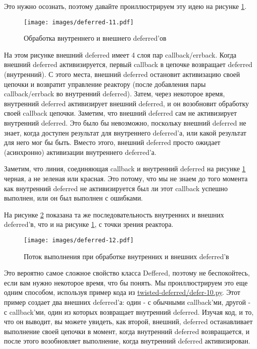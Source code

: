 Это нужно осознать, поэтому давайте проиллюстрируем эту идею 
на рисунке \ref{fig:deferred-11}.

\begin{figure}[h]
\begin{center}
    \texttt{[image: images/deferred-11.pdf]}
    \caption{Обработка внутреннего и внешнего deferred'ов\label{fig:deferred-11}}
\end{center}
\end{figure}

На этом рисунке внешний deferred имеет 4 слоя пар callback/errback. 
Когда внешний deferred активизируется, первый callback в цепочке 
возвращает deferred (внутренний). С этого места, внешний deferred 
остановит активизацию своей цепочки и возвратит управление реактору 
(после добавления пары callback/errback во внутренний deferred). 
Затем, через некоторое время, внутренний deferred активизирует 
внешний deferred, и он возобновит обработку своей callback цепочки. 
Заметим, что внешний deferred сам не активизирует внутренний deferred. 
Это было бы невозможно, поскольку внешний deferred не знает, когда 
доступен результат для внутреннего deferred'а, или какой результат для него  
мог бы быть. Вместо этого, внешний deferred просто ожидает (асинхронно) 
активизации внутреннего deferred'а.


Заметим, что линия, соединяющая callback и 
внутренний deferred на рисунке \ref{fig:deferred-11} 
черная, а не зеленая или красная.  Это потому, что мы 
не знаем до того момента как внутренний deferred не активизируется
был ли этот callback успешно выполнен, или он был выполнен 
с ошибками.  


На рисунке \ref{fig:deferred-12} показана та же последовательность 
внутренних и внешних deferred'в, что и на рисунке \ref{fig:deferred-11}, 
с точки зрения реактора.

\begin{figure}[h]
\begin{center}
    \texttt{[image: images/deferred-12.pdf]}
    \caption{Поток выполнения при обработке внутренних и внешних deferred'в\label{fig:deferred-12}}
\end{center}
\end{figure}

Это вероятно самое сложное свойство класса Deffered, 
поэтому не беспокойтесь, если вам нужно некоторое время, 
что бы понять. Мы проиллюстрируем это еще одним способом, 
используя пример кода из 
\href{http://github.com/jdavisp3/twisted-intro/blob/master/twisted-deferred/defer-10.py#L1}{twisted-deferred/defer-10.py}. Этот пример создает два внешних deferred'а: 
один - с обычными callback'ми, другой - с callback'ми, один из которых 
возвращает внутренний deferred. Изучая код, и то, что он выводит, 
вы можете увидеть, как второй, внешний, deferred останавливает 
выполнение своей цепочки в момент, когда внутренний  
deferred возвращается,  и после этого возобновляет выполнение, когда 
внутренний deferred активизирован.



